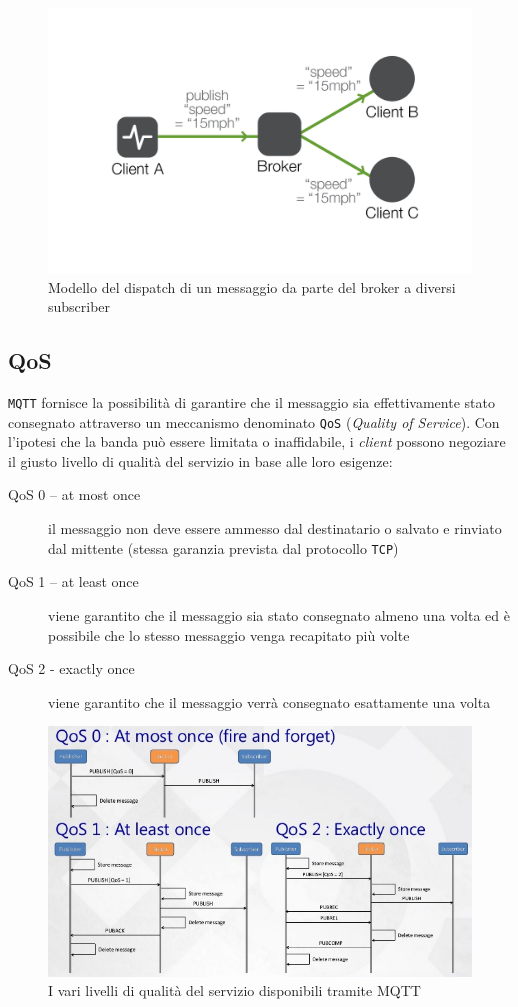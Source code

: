\begin{figure}[H]
  \centering
  \includegraphics[width=0.95\linewidth, keepaspectratio]{mqtt}
  \caption{Modello del dispatch di un messaggio da parte del broker a diversi subscriber}
  \label{fig:mqtt}
\end{figure}

\subsection{QoS}
\label{sub:mqttQos}

\verb+MQTT+ fornisce la possibilità di garantire che il messaggio sia effettivamente stato consegnato attraverso un meccanismo denominato \verb+QoS+ (\textit{Quality of Service}).
Con l'ipotesi che la banda può essere limitata o inaffidabile, i \textit{client} possono negoziare il giusto livello di qualità del servizio in base alle loro esigenze:
\begin{description}
\item[QoS 0 – at most once] il messaggio non deve essere ammesso dal destinatario o salvato e rinviato dal mittente (stessa garanzia prevista dal protocollo \verb+TCP+)
\item[QoS 1 – at least once] viene garantito che il messaggio sia stato consegnato almeno una volta ed è possibile che lo stesso messaggio venga recapitato più volte
\item[QoS 2 - exactly once] viene garantito che il messaggio verrà consegnato esattamente una volta
\end{description}

\begin{figure}[H]
  \centering
  \includegraphics[width=0.95\linewidth, keepaspectratio]{qos}
  \caption{I vari livelli di qualità del servizio disponibili tramite MQTT}
  \label{fig:qos}
\end{figure}
